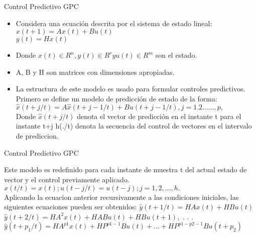 \documentclass{beamer}
\begin{document}
\begin{frame}{Control Predictivo GPC}
\begin{justify}
\vspace{0.3cm}
\begin{itemize}
   \item Considera una ecuación descrita por el sistema de estado lineal:
   $x(t+1)=Ax(t)+Bu(t)$\\
   $y(t)=Hx(t)$
\item Donde $x(t) \in R^n, y(t) \in R^r y u(t) \in R^m$ son el estado.
\item A, B y H son matrices con dimensiones apropiadas.
\item La estructura de este modelo es usado para formular controles predictivos. Primero se define un modelo de predicción de estado de la forma:
\\
$\hat{x}(t+j/t)=A\hat{x}(t+j-1/t)+Bu(t+j-1/t), j=1. 2. ....., p, $ 
\\
Donde $\hat{x}(t+j/t)$ denota el vector de predicción en el instante t para  el instante t+j h(./t) denota la secuencia del control de vectores en el intervalo de prediccion. 
\end{itemize}
\end{justify}
\end{frame}

\begin{frame}{Control Predictivo GPC}
\begin{justify}
\vspace{0.3cm}
\begin{itemize}
Este modelo es redefinido para cada instante de muestra t  del actual estado de vector y el control previamente aplicado.
$\hat{x}(t/t)=x(t); u(t-j/t)=u(t-j); j=1,2,...,h.$
\\
Aplicando la ecuacion anterior recursivamente a las condiciones iniciales, las siguientes ecuaciones pueden ser obtenidos:
$\hat{y}(t+1/t)= HAx(t)+HBu(t)$
$\hat{y}(t+2/t)= HA^2x(t)+HABu(t)+HBu(t+1),$
.
.
.
$\hat{y}(t+p_1/t)=HA^{p1}x(t)+HP^{p1-1}Bu(t)+...+HP^{p1-p2-1}Bu(t+p_2)$

\end{itemize}
\end{justify}
\end{frame}
\end{document}
